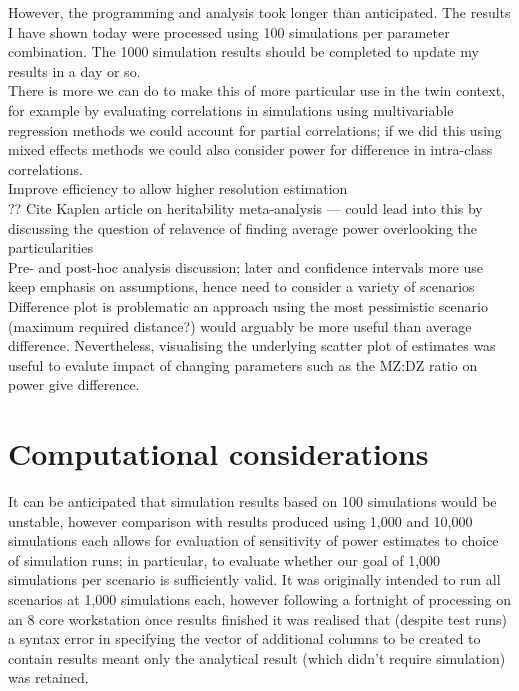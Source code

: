 
However, the programming and analysis took longer than anticipated.  The results I have shown today were processed using 100 simulations per parameter combination.  The 1000 simulation results should be completed to update my results in a day or so.
\\
There is more we can do to make this of more particular use in the twin context, for example by evaluating correlations in simulations using multivariable regression methods we could account for partial correlations; if we did this using mixed effects methods we could also consider power for difference in intra-class correlations.
\\
Improve efficiency to allow higher resolution estimation
\\

??
Cite Kaplen article on heritability meta-analysis --- could lead into this by discussing the question of relavence of finding average power overlooking the particularities
\\
Pre- and post-hoc analysis discussion; later and confidence intervals more use
\\
keep emphasis on assumptions, hence need to consider a variety of scenarios
\\

Difference plot is problematic \; an approach using the most pessimistic scenario (maximum required distance?) would arguably be more useful than average difference.  Nevertheless, visualising the underlying scatter plot of estimates was useful to evalute impact of changing parameters such as the MZ:DZ ratio on power give difference.

\section{Computational considerations}
It can be anticipated that simulation results based on 100 simulations would be unstable, however comparison with results produced using 1,000 and 10,000 simulations each allows for evaluation of sensitivity of power estimates to choice of simulation runs; in particular, to evaluate whether our goal of 1,000 simulations per scenario is sufficiently valid.  It was originally intended to run all scenarios at 1,000 simulations each, however following a fortnight of processing on an 8 core workstation once results finished it was realised that (despite test runs) a syntax error in specifying the vector of additional columns to be created to contain results meant only the analytical result (which didn't require simulation) was retained.

